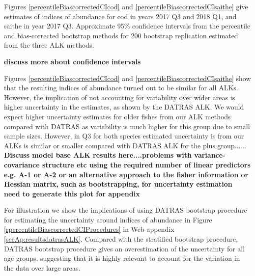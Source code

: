 \documentclass[a4paper 12pt]{article}
\numberwithin{equation}{section}
\begin{document}
\clearpage
Figures \ref{percentileBiascorrectedCIcod} and  \ref{percentileBiascorrectedCIsaithe} give estimates of indices of abundance for cod in years 2017 Q3 and 2018 Q1, and  saithe in year 2017 Q3. Approximate 95\% confidence intervals from the percentile and bias-corrected bootstrap methods for 200 bootstrap replication estimated from the three ALK methods.

{\bf discuss more about confidence intervals}



Figures \ref{percentileBiascorrectedCIcod} and  \ref{percentileBiascorrectedCIsaithe} show that the resulting indices of abundance turned out to be similar for all ALKs. However, the implication of not accounting for variability over wider areas is higher  uncertainty in the estimates, as shown by the DATRAS ALK. We would expect higher uncertainty estimates for older fishes from our ALK methods compared with DATRAS as variability is much higher for this group due to small sample sizes. However, in Q3 for both species estimated uncertainty is from our ALKs is similar or smaller compared with DATRAS ALK for the plus group......\\

{\bf Discuss model base ALK results here....problems with variance-covariance structure etc using the required number of linear predictors e.g. A-1 or A-2 or an alternative approach to the fisher information or Hessian matrix, such as bootstrapping, for uncertainty estimation}\\

{\bf need to generate this plot for appendix}

For illustration we show the implications of using DATRAS bootstrap procedure for estimating the uncertainty around indices of abundance  in Figure \ref{rpercentileBiascorrectedCIProcedures} in Web appendix \ref{secAp:resultsdatrasALK}. Compared with the stratified bootstrap procedure, DATRAS bootstrap procedure gives an overestimation of the uncertainty for all age groups, suggesting that it is highly relevant to account for the variation in the data over large areas. 


\clearpage
\end{document}
